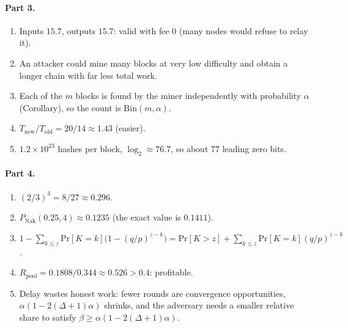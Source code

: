 \documentclass[11pt,a4paper]{article}
\theoremstyle{definition}
\theoremstyle{plain}
\theoremstyle{remark}
\renewcommand{\Pr}{\mathrm{Pr}}
\begin{document}
\paragraph{Part 3.}
\begin{enumerate}[nosep,leftmargin=1.5em]
\item Inputs $15.7$, outputs $15.7$: valid with fee $0$ (many nodes would refuse to relay it).
\item An attacker could mine many blocks at very low difficulty and obtain a longer chain with far less total work.
\item Each of the $m$ blocks is found by the miner independently with probability $\alpha$ (Corollary), so the count is $\mathrm{Bin}(m,\alpha)$.
\item $T_{\text{new}}/T_{\text{old}}=20/14\approx1.43$ (easier).
\item $1.2\times10^{23}$ hashes per block, $\log_2\approx76.7$, so about $77$ leading zero bits.
\end{enumerate}

\paragraph{Part 4.}
\begin{enumerate}[nosep,leftmargin=1.5em]
\item $(2/3)^3=8/27\approx0.296$.
\item $P_{\text{Nak}}(0.25,4)\approx0.1235$ (the exact value is $0.1411$).
\item $1-\sum_{k\le z}\Pr[K=k]\big(1-(q/p)^{z-k}\big)=\Pr[K>z]+\sum_{k\le z}\Pr[K=k](q/p)^{z-k}$.
\item $R_{\text{pool}}=0.1808/0.344\approx0.526>0.4$: profitable.
\item Delay wastes honest work: fewer rounds are convergence opportunities, $\alpha(1-2(\Delta+1)\alpha)$ shrinks, and the adversary needs a smaller relative share to satisfy $\beta\ge\alpha(1-2(\Delta+1)\alpha)$.
\end{enumerate}
\end{document}
